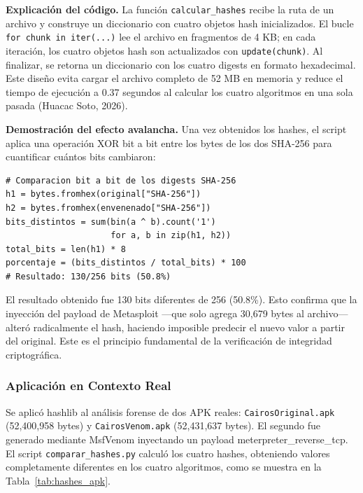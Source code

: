 \documentclass[12pt,a4paper]{article}
\begin{document}
\textbf{Explicación del código.} La función \texttt{calcular\_hashes}
recibe la ruta de un archivo y construye un diccionario con cuatro
objetos hash inicializados. El bucle \texttt{for chunk in iter(...)}
lee el archivo en fragmentos de 4 KB; en cada iteración, los cuatro
objetos hash son actualizados con \texttt{update(chunk)}. Al finalizar,
se retorna un diccionario con los cuatro digests en formato hexadecimal.
Este diseño evita cargar el archivo completo de 52 MB en memoria y
reduce el tiempo de ejecución a 0.37 segundos al calcular los cuatro
algoritmos en una sola pasada (Huacac Soto, 2026).

\textbf{Demostración del efecto avalancha.} Una vez obtenidos los
hashes, el script aplica una operación XOR bit a bit entre los bytes
de los dos SHA-256 para cuantificar cuántos bits cambiaron:

\begin{lstlisting}[caption={Cálculo del efecto avalancha con XOR sobre SHA-256},
                   label=lst:avalancha]
# Comparacion bit a bit de los digests SHA-256
h1 = bytes.fromhex(original["SHA-256"])
h2 = bytes.fromhex(envenenado["SHA-256"])
bits_distintos = sum(bin(a ^ b).count('1')
                     for a, b in zip(h1, h2))
total_bits = len(h1) * 8
porcentaje = (bits_distintos / total_bits) * 100
# Resultado: 130/256 bits (50.8%)
\end{lstlisting}

El resultado obtenido fue 130 bits diferentes de 256 (50.8\%). Esto
confirma que la inyección del payload de Metasploit —que solo agrega
30,679 bytes al archivo— alteró radicalmente el hash, haciendo imposible
predecir el nuevo valor a partir del original. Este es el principio
fundamental de la verificación de integridad criptográfica.

\subsubsection{Aplicación en Contexto Real}

Se aplicó hashlib al análisis forense de dos APK reales:
\texttt{CairosOriginal.apk} (52,400,958 bytes) y
\texttt{CairosVenom.apk} (52,431,637 bytes). El segundo fue generado
mediante MsfVenom inyectando un payload meterpreter\_reverse\_tcp. El
script \texttt{comparar\_hashes.py} calculó los cuatro hashes, obteniendo
valores completamente diferentes en los cuatro algoritmos, como se
muestra en la Tabla~\ref{tab:hashes_apk}.
\end{document}
